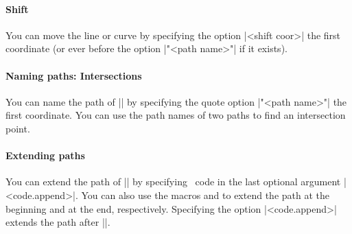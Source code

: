 \paragraph{Shift}
You can move the line or curve by specifying the option |<shift coor>|   the first coordinate (or ever before the option |"<path name>"| if it exists).

\begin{tzcode}{.3}
\end{tzcode}

\paragraph{Naming paths: Intersections}
You can name the path of |\tzlink| by specifying the quote option |"<path name>"|  the first coordinate.
You can use the path names of two paths to find an intersection point.

\begin{tzcode}{.3}
\end{tzcode}


\paragraph{Extending paths}
You can extend the path of |\tzlink| by specifying \Tikz\ code in the last optional argument |<code.append>|.
You can also use the macros \icmd{\tzlinkAtBegin} and \icmd{\tzlinkAtEnd} to extend the path at the beginning and at the end, respectively.
Specifying the option |<code.append>| extends the path after |\tzlinkAtEnd|.

\begin{tzcode}{.3}
\end{tzcode}


